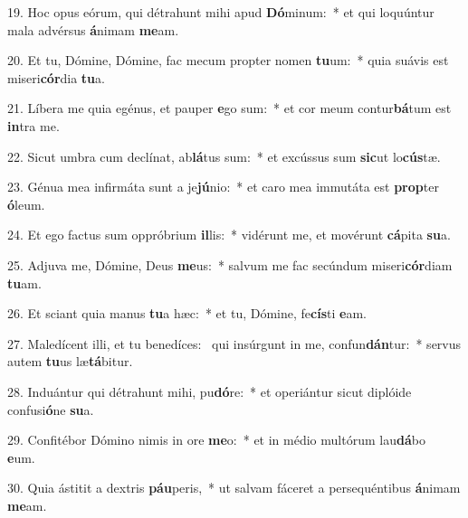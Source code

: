 19. Hoc opus eórum, qui détrahunt mihi apud \textbf{Dó}minum:~*  et qui loquúntur mala advérsus \textbf{á}nimam \textbf{me}am.\

20. Et tu, Dómine, Dómine, fac mecum propter nomen \textbf{tu}um:~*  quia suávis est miseri\textbf{cór}dia \textbf{tu}a.\

21. Líbera me quia egénus, et pauper \textbf{e}go sum:~*  et cor meum contur\textbf{bá}tum est \textbf{in}tra me.\

22. Sicut umbra cum declínat, ab\textbf{lá}tus sum:~*  et excússus sum \textbf{sic}ut lo\textbf{cús}tæ.\

23. Génua mea infirmáta sunt a je\textbf{jú}nio:~*  et caro mea immutáta est \textbf{prop}ter \textbf{ó}leum.\

24. Et ego factus sum oppróbrium \textbf{il}lis:~*  vidérunt me, et movérunt \textbf{cá}pita \textbf{su}a.\

25. Adjuva me, Dómine, Deus \textbf{me}us:~*  salvum me fac secúndum miseri\textbf{cór}diam \textbf{tu}am.\

26. Et sciant quia manus \textbf{tu}a hæc:~*  et tu, Dómine, fe\textbf{cís}ti \textbf{e}am.\

27. Maledícent illi, et tu benedíces: \dag\  qui insúrgunt in me, confun\textbf{dán}tur:~*  servus autem \textbf{tu}us læ\textbf{tá}bitur.\

28. Induántur qui détrahunt mihi, pu\textbf{dó}re:~*  et operiántur sicut diplóide confusi\textbf{ó}ne \textbf{su}a.\

29. Confitébor Dómino nimis in ore \textbf{me}o:~*  et in médio multórum lau\textbf{dá}bo \textbf{e}um.\

30. Quia ástitit a dextris \textbf{páu}peris,~*  ut salvam fáceret a persequéntibus \textbf{á}nimam \textbf{me}am.\

